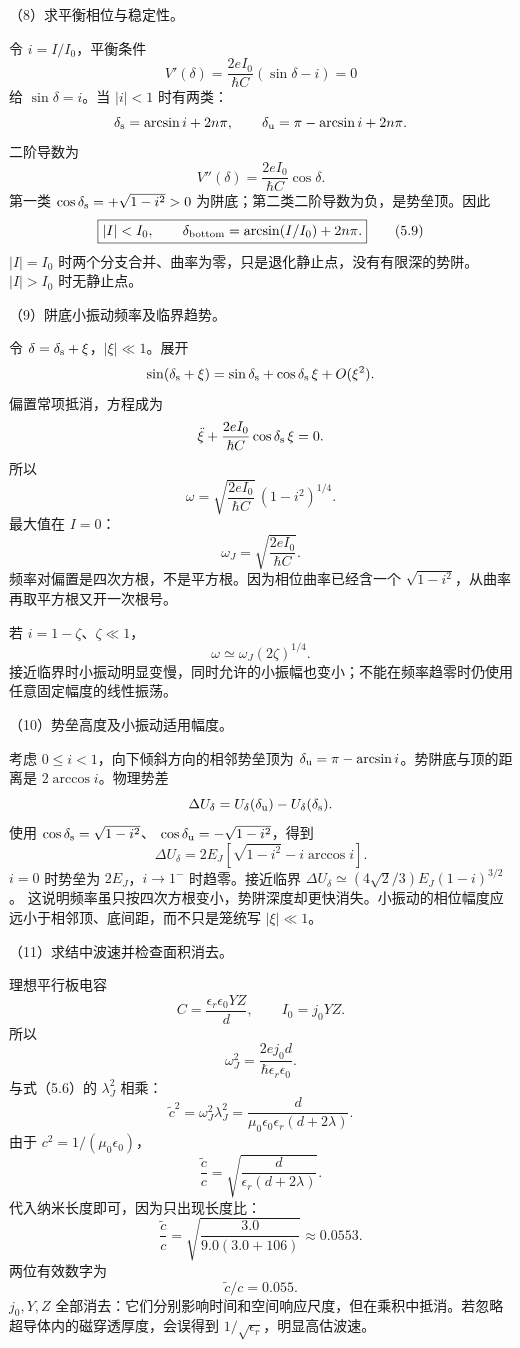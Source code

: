 \documentclass[12pt,a4paper,fontset=fandol]{ctexart}
\begin{document}
（8）求平衡相位与稳定性。

令 \(i=I/I_0\)，平衡条件 \[
V'(\delta)=\frac{2eI_0}{\hbar C}(\sin\delta-i)=0
\] 给 \(\sin\delta=i\)。当 \(|i|<1\) 时有两类： \[
\delta_{\rm s}=\arcsin i+2n\pi,
\qquad
\delta_{\rm u}=\pi-\arcsin i+2n\pi.
\] 二阶导数为 \[
V''(\delta)=\frac{2eI_0}{\hbar C}\cos\delta.
\] 第一类 \(\cos\delta_{\rm s}=+\sqrt{1-i^2}>0\)
为阱底；第二类二阶导数为负，是势垒顶。因此 \[
\boxed{|I|<I_0,\qquad
\delta_{\rm bottom}=\arcsin(I/I_0)+2n\pi.}\tag{5.9}
\] \(|I|=I_0\)
时两个分支合并、曲率为零，只是退化静止点，没有有限深的势阱。\(|I|>I_0\)
时无静止点。

（9）阱底小振动频率及临界趋势。

令 \(\delta=\delta_{\rm s}+\xi\)，\(|\xi|\ll1\)。展开 \[
\sin(\delta_{\rm s}+\xi)
=\sin\delta_{\rm s}+\cos\delta_{\rm s}\,\xi+O(\xi^2).
\] 偏置常项抵消，方程成为 \[
\ddot\xi+\frac{2eI_0}{\hbar C}\cos\delta_{\rm s}\,\xi=0.
\] 所以 \[
\boxed{\omega=
\sqrt{\frac{2eI_0}{\hbar C}}\,(1-i^2)^{1/4}.}\tag{5.10}
\] 最大值在 \(I=0\)： \[
\boxed{\omega_J=\sqrt{\frac{2eI_0}{\hbar C}}.}\tag{5.11}
\] 频率对偏置是四次方根，不是平方根。因为相位曲率已经含一个
\(\sqrt{1-i^2}\)，从曲率再取平方根又开一次根号。

若 \(i=1-\zeta\)、\(\zeta\ll1\)， \[
\omega\simeq\omega_J(2\zeta)^{1/4}.
\]
接近临界时小振动明显变慢，同时允许的小振幅也变小；不能在频率趋零时仍使用任意固定幅度的线性振荡。

（10）势垒高度及小振动适用幅度。

考虑 \(0\le i<1\)，向下倾斜方向的相邻势垒顶为
\(\delta_{\rm u}=\pi-\arcsin i\)。势阱底与顶的距离是
\(2\arccos i\)。物理势差 \[
\Delta U_\delta
=U_\delta(\delta_{\rm u})-U_\delta(\delta_{\rm s}).
\] 使用 \(\cos\delta_{\rm s}=\sqrt{1-i^2}\)、
\(\cos\delta_{\rm u}=-\sqrt{1-i^2}\)，得到 \[
\boxed{\Delta U_\delta=
2E_J\left[\sqrt{1-i^2}-i\arccos i\right].}\tag{5.12}
\] \(i=0\) 时势垒为 \(2E_J\)，\(i\to1^-\) 时趋零。接近临界
\(\Delta U_\delta\simeq(4\sqrt2/3)E_J(1-i)^{3/2}\)。
这说明频率虽只按四次方根变小，势阱深度却更快消失。小振动的相位幅度应远小于相邻顶、底间距，而不只是笼统写
\(|\xi|\ll1\)。

（11）求结中波速并检查面积消去。

理想平行板电容 \[
C=\frac{\epsilon_r\epsilon_0YZ}{d},\qquad I_0=j_0YZ.
\] 所以 \[
\omega_J^2=\frac{2ej_0d}{\hbar\epsilon_r\epsilon_0}.
\] 与式（5.6）的 \(\lambda_J^2\) 相乘： \[
\tilde c^2=\omega_J^2\lambda_J^2
=\frac{d}{\mu_0\epsilon_0\epsilon_r(d+2\lambda)}.
\] 由于 \(c^2=1/(\mu_0\epsilon_0)\)， \[
\boxed{\frac{\tilde c}{c}
=\sqrt{\frac{d}{\epsilon_r(d+2\lambda)}}.}\tag{5.13}
\] 代入纳米长度即可，因为只出现长度比： \[
\frac{\tilde c}{c}
=\sqrt{\frac{3.0}{9.0(3.0+106)}}\approx0.0553.
\] 两位有效数字为 \[
\boxed{\tilde c/c=0.055.}
\] \(j_0,Y,Z\)
全部消去：它们分别影响时间和空间响应尺度，但在乘积中抵消。若忽略超导体内的磁穿透厚度，会误得到
\(1/\sqrt{\epsilon_r}\)，明显高估波速。
\end{document}
